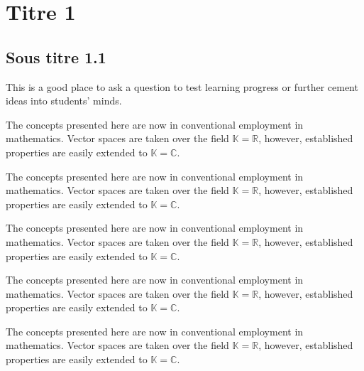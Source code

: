 \documentclass[10pt,fleqn]{article} %
\begin{document}


\newpage


\section{Titre 1}
\subsection{Sous titre 1.1}
\lipsum[1-2]

\begin{exercise}[toto]
This is a good place to ask a question to test learning progress or further cement ideas into students' minds.
\end{exercise}

\begin{corollary}
The concepts presented here are now in conventional employment in mathematics. Vector spaces are taken over the field $\mathbb{K}=\mathbb{R}$, however, established properties are easily extended to $\mathbb{K}=\mathbb{C}$.
\end{corollary}

\begin{remark}
The concepts presented here are now in conventional employment in mathematics. Vector spaces are taken over the field $\mathbb{K}=\mathbb{R}$, however, established properties are easily extended to $\mathbb{K}=\mathbb{C}$.
\end{remark}

\begin{theorem}
The concepts presented here are now in conventional employment in mathematics. Vector spaces are taken over the field $\mathbb{K}=\mathbb{R}$, however, established properties are easily extended to $\mathbb{K}=\mathbb{C}$.
\end{theorem}

\begin{theorem}[Titre]
The concepts presented here are now in conventional employment in mathematics. Vector spaces are taken over the field $\mathbb{K}=\mathbb{R}$, however, established properties are easily extended to $\mathbb{K}=\mathbb{C}$.
\end{theorem}

\begin{definition}[Titre]
The concepts presented here are now in conventional employment in mathematics. Vector spaces are taken over the field $\mathbb{K}=\mathbb{R}$, however, established properties are easily extended to $\mathbb{K}=\mathbb{C}$.
\end{definition}
\end{document}
